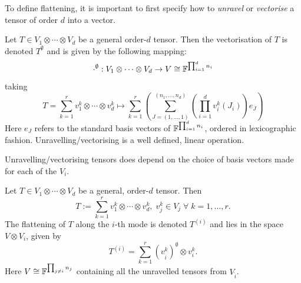 \documentclass[../Lael_John_MasterThesis_Draft.tex]{subfiles}
\begin{document}
To define flattening, it is important to first specify how to \textit{unravel} or \textit{vectorise} a tensor of order $d$ into a vector.
\begin{definition}\label{defn:tensorunravelling}
    Let $T \in V_1 \otimes \cdots \otimes V_d$ be a general order-$d$ tensor. Then the vectorisation of $T$ is denoted $T^{\emptyset}$ and is given by the following mapping: $$\cdot^{\emptyset}: V_1 \otimes \cdots \otimes V_d \to V \cong \mathbb{F}^{\prod_{i=1}^{d}n_i}$$ taking $$T = \sum_{k=1}^{r} v_1^k \otimes \cdots \otimes v_d^k \mapsto \sum_{k=1}^{r} \left(\sum_{J = (1,\ldots,1)}^{(n_1, \ldots, n_d)} \left(\prod_{i=1}^{d} v_i^k(J_i)\right) e_J \right)$$ Here $e_J$ refers to the standard basis vectors of $\mathbb{F}^{\prod_{i=1}^{d}n_i}$, ordered in lexicographic fashion. Unravelling/vectorising is a well defined, linear operation. 
\end{definition}
\begin{remark}
    Unravelling/vectorising tensors does depend on the choice of basis vectors made for each of the $V_i$.
\end{remark}
\begin{definition}\label{defn:tensorflattening}
    Let $T \in V_1 \otimes \cdots \otimes V_d$ be a general, order-$d$ tensor. Then $$T := \sum_{k=1}^{r} v_1^k \otimes \cdots \otimes v_d^k, \; v_j^k \in V_j \;\forall\; k = 1, \ldots, r.$$The flattening of $T$ along the $i$-th mode is denoted $T^{(i)}$ and lies in the space $ V \otimes V_i$, given by $$T^{(i)} = \sum_{k=1}^{r} (v_{\hat{i}}^k)^{\emptyset} \otimes v_i^k.$$ Here $V \cong \mathbb{F}^{\prod_{j \neq i} n_j}$ containing all the unravelled tensors from $V_{\hat{i}}$. 
\end{definition}
\end{document}
